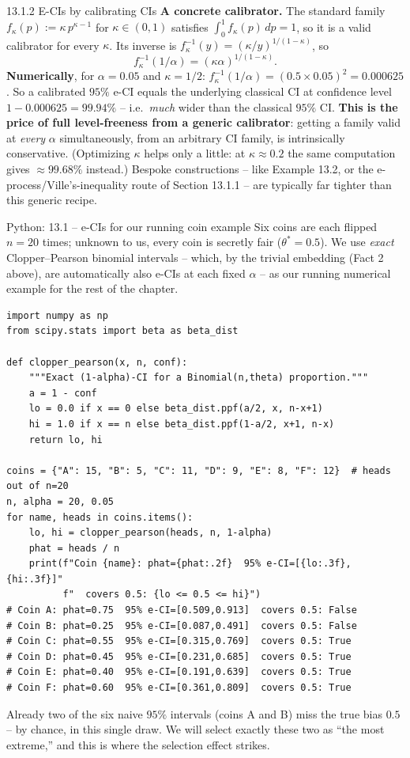 \documentclass[aspectratio=169,10pt]{beamer}
\begin{document}
\begin{frame}[allowframebreaks]{13.1.2 E-CIs by calibrating CIs}
  \textbf{A concrete calibrator.} The standard family $f_\kappa(p) := \kappa\, p^{\kappa-1}$ for $\kappa\in(0,1)$ satisfies $\int_0^1 f_\kappa(p)\,dp = 1$, so it is a valid calibrator for every $\kappa$. Its inverse is $f_\kappa^{-1}(y) = (\kappa/y)^{1/(1-\kappa)}$, so
  \[
    f_\kappa^{-1}(1/\alpha) = (\kappa\alpha)^{1/(1-\kappa)}.
  \]
  \textbf{Numerically}, for $\alpha=0.05$ and $\kappa=1/2$: $f_\kappa^{-1}(1/\alpha) = (0.5\times0.05)^{2} = 0.000625$. So a calibrated $95\%$ e-CI equals the underlying classical CI at confidence level $1-0.000625 = 99.94\%$ -- i.e.\ \emph{much} wider than the classical $95\%$ CI. \textbf{This is the price of full level-freeness from a generic calibrator}: getting a family valid at \emph{every} $\alpha$ simultaneously, from an arbitrary CI family, is intrinsically conservative. (Optimizing $\kappa$ helps only a little: at $\kappa\approx0.2$ the same computation gives $\approx99.68\%$ instead.) Bespoke constructions -- like Example 13.2, or the e-process/Ville's-inequality route of Section 13.1.1 -- are typically far tighter than this generic recipe.
\end{frame}

\begin{frame}[fragile]{Python: 13.1 -- e-CIs for our running coin example}
  Six coins are each flipped $n=20$ times; unknown to us, every coin is secretly fair ($\theta^*=0.5$). We use \emph{exact} Clopper--Pearson binomial intervals -- which, by the trivial embedding (Fact 2 above), are automatically also e-CIs at each fixed $\alpha$ -- as our running numerical example for the rest of the chapter.
  \begin{lstlisting}
import numpy as np
from scipy.stats import beta as beta_dist

def clopper_pearson(x, n, conf):
    """Exact (1-alpha)-CI for a Binomial(n,theta) proportion."""
    a = 1 - conf
    lo = 0.0 if x == 0 else beta_dist.ppf(a/2, x, n-x+1)
    hi = 1.0 if x == n else beta_dist.ppf(1-a/2, x+1, n-x)
    return lo, hi

coins = {"A": 15, "B": 5, "C": 11, "D": 9, "E": 8, "F": 12}  # heads out of n=20
n, alpha = 20, 0.05
for name, heads in coins.items():
    lo, hi = clopper_pearson(heads, n, 1-alpha)
    phat = heads / n
    print(f"Coin {name}: phat={phat:.2f}  95% e-CI=[{lo:.3f},{hi:.3f}]"
          f"  covers 0.5: {lo <= 0.5 <= hi}")
# Coin A: phat=0.75  95% e-CI=[0.509,0.913]  covers 0.5: False
# Coin B: phat=0.25  95% e-CI=[0.087,0.491]  covers 0.5: False
# Coin C: phat=0.55  95% e-CI=[0.315,0.769]  covers 0.5: True
# Coin D: phat=0.45  95% e-CI=[0.231,0.685]  covers 0.5: True
# Coin E: phat=0.40  95% e-CI=[0.191,0.639]  covers 0.5: True
# Coin F: phat=0.60  95% e-CI=[0.361,0.809]  covers 0.5: True
  \end{lstlisting}
  Already two of the six naive $95\%$ intervals (coins A and B) miss the true bias $0.5$ -- by chance, in this single draw. We will select exactly these two as ``the most extreme,'' and this is where the selection effect strikes.
\end{frame}
\end{document}
